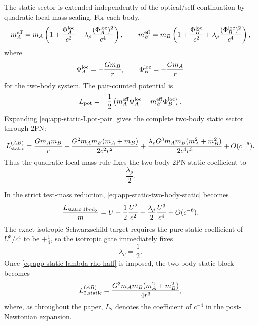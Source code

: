 \documentclass[11pt]{article}
\newcommand{\TwoPN}{\mathrm{2PN}}
\begin{document}
The static sector is extended independently of the optical/self continuation by
quadratic local mass scaling.  For each body,
\begin{equation}
m_A^{\rm eff}
=m_A\left(1+\frac{\Phi_A^{\rm loc}}{c^2}
+\lambda_\rho\frac{(\Phi_A^{\rm loc})^2}{c^4}\right),
\qquad
m_B^{\rm eff}
=m_B\left(1+\frac{\Phi_B^{\rm loc}}{c^2}
+\lambda_\rho\frac{(\Phi_B^{\rm loc})^2}{c^4}\right),
\label{eq:app-static-meff}
\end{equation}
where
\begin{equation}
\Phi_A^{\rm loc}=-\frac{Gm_B}{r},
\qquad
\Phi_B^{\rm loc}=-\frac{Gm_A}{r}
\label{eq:app-static-local-potentials-two-body}
\end{equation}
for the two-body system.
The pair-counted potential is
\begin{equation}
L_{\rm pot}
=-\frac12\left(m_A^{\rm eff}\Phi_A^{\rm loc}+m_B^{\rm eff}\Phi_B^{\rm loc}\right).
\label{eq:app-static-Lpot-pair}
\end{equation}
Expanding \cref{eq:app-static-Lpot-pair} gives the complete two-body static sector through
\(\TwoPN\):
\begin{equation}
L_{\rm static}^{(AB)}
=\frac{Gm_A m_B}{r}
-\frac{G^2m_A m_B(m_A+m_B)}{2c^2r^2}
+\frac{\lambda_\rho G^3m_A m_B(m_A^2+m_B^2)}{2c^4r^3}
+O(c^{-6}).
\label{eq:app-static-two-body-static}
\end{equation}
Thus the quadratic local-mass rule fixes the two-body \(\TwoPN\) static coefficient to
\begin{equation}
\frac{\lambda_\rho}{2}.
\label{eq:app-static-two-body-lambda-half}
\end{equation}

In the strict test-mass reduction, \cref{eq:app-static-two-body-static} becomes
\begin{equation}
\frac{L_{\rm static,1body}}{m}
=U-\frac12\frac{U^2}{c^2}+\frac{\lambda_\rho}{2}\frac{U^3}{c^4}+O(c^{-6}).
\label{eq:app-static-one-body-static}
\end{equation}
The exact isotropic Schwarzschild target requires the pure-static coefficient of
\(U^3/c^4\) to be \(+\frac14\), so the isotropic gate immediately fixes
\begin{equation}
\lambda_\rho=\frac12.
\label{eq:app-static-lambda-rho-half}
\end{equation}
Once \cref{eq:app-static-lambda-rho-half} is imposed, the two-body static block becomes
\begin{equation}
L_{2,\rm static}^{(AB)}
=\frac{G^3m_A m_B(m_A^2+m_B^2)}{4r^3},
\label{eq:app-static-two-body-static-fixed}
\end{equation}
where, as throughout the paper, \(L_2\) denotes the coefficient of \(c^{-4}\) in the
post-Newtonian expansion.
\end{document}
